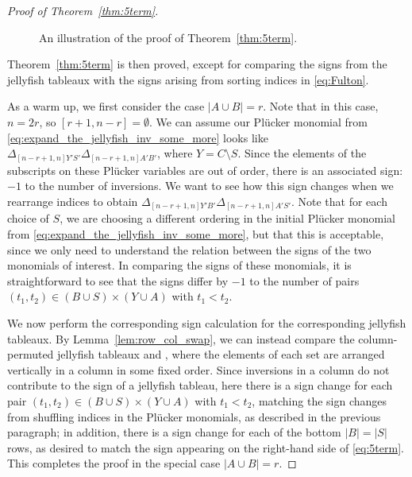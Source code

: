 \begin{proof}[Proof of Theorem~\ref{thm:5term}]
\begin{figure}[htb]
    \centering
    \caption{An illustration of the proof of Theorem~\ref{thm:5term}.}
    \label{fig:jellyfish_sign_calc}
\end{figure}

Theorem~\ref{thm:5term} is then proved, except for comparing the signs from the jellyfish tableaux with the signs arising from sorting indices in \eqref{eq:Fulton}. 

As a warm up, we first consider the case $|A \cup B| = r$. Note that in this case, $n=2r$, so $[r+1,n-r]=\emptyset$.  We can assume our  Pl\"ucker monomial from \eqref{eq:expand_the_jellyfish_inv_some_more} looks like $\Delta_{[n-r+1,n]  Y'S'}\Delta_{[n-r+1,n]  A'B'}$, where $Y = C \setminus S$. Since the elements of the subscripts on these Pl\"ucker variables are out of order, there is an associated sign: $-1$ to the number of inversions. We want to see how this sign changes when we rearrange indices to obtain $\Delta_{[n-r+1,n]  Y'B'} \Delta_{[n-r+1,n]  A'S'}$.  Note that for each choice of $S$, we are choosing a different ordering in the initial Pl\"ucker monomial from \eqref{eq:expand_the_jellyfish_inv_some_more}, but that this is acceptable, since we only need to understand the relation between the signs of the two monomials of interest. In comparing the signs of these monomials, it is straightforward to see that the signs differ by $-1$ to the number of pairs $(t_1, t_2) \in (B \cup S) \times (Y \cup A)$ with $t_1 < t_2$.

We now perform the corresponding sign calculation for the corresponding jellyfish tableaux.
By Lemma~\ref{lem:row_col_swap}, we can instead compare the column-permuted jellyfish tableaux 
 and  , where the elements of each set are arranged vertically in a column in some fixed order. Since inversions in a column do not contribute to the sign of a jellyfish tableau, here there is a sign change for each pair $(t_1, t_2) \in (B \cup S) \times (Y \cup A)$ with $t_1 < t_2$, matching the sign changes from shuffling indices in the Pl\"ucker monomials, as described in the previous paragraph; in addition, there is a sign change for each of the bottom $|B| = |S|$ rows, as desired to match the sign appearing on the right-hand side of \eqref{eq:5term}. This completes the proof in the special case $|A \cup B| = r$.


\end{proof}
